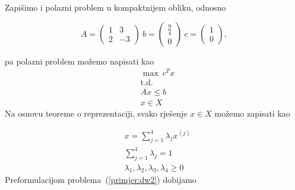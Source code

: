 \documentclass[a4paper, utf8, 11pt, colorlinks]{book}
\theoremstyle{definition}
\begin{document}
 Zapišimo i polazni problem u kompaktnijem obliku, odnosno
 
 $$
 A = \left(\begin{array}{cc}
 	1 & 3 \\
 	2 & -3
 \end{array}\right) \ b=\left(\begin{array}{c}
 \frac 9 4\\
 0
\end{array}\right)\ c=\left(\begin{array}{c}
1\\
0
\end{array}\right),
 $$
 
 pa polazni problem možemo napisati kao
    \begin{equation}
 	\begin{aligned}\label{primjer:dw2}
 		&\max\ c^Tx\\
 		&\mbox{t.d.}\\
 		  &Ax\leqslant b\\
 		&x \in X
 	\end{aligned}
 \end{equation}
Na osnovu teoreme o reprezentaciji, svako rješenje $x \in X$ možemo zapisati kao

$$\begin{aligned}
&x = \sum_{j=1}^4\lambda_j x^{(j)}\\
&\sum_{j=1}^4\lambda_j=1\\
&\lambda_1,\lambda_2,\lambda_3,\lambda_4\geqslant 0
\end{aligned}$$
 Preformulacijom problema~(\ref{primjer:dw2}) dobijamo
 
\end{document}
